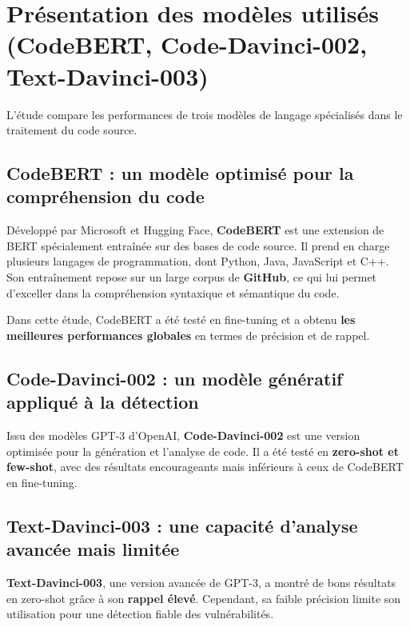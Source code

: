 \chapter{Présentation des modèles utilisés (CodeBERT, Code-Davinci-002, Text-Davinci-003)}



L’étude compare les performances de trois
modèles de langage spécialisés dans le traitement du code source.



\section{CodeBERT : un modèle optimisé pour la compréhension du code}



Développé par Microsoft et Hugging Face, \textbf{CodeBERT}
est une extension de BERT spécialement entraînée sur des bases de code source.
Il prend en charge plusieurs langages de programmation, dont Python, Java,
JavaScript et C++. Son entraînement repose sur un large corpus de \textbf{GitHub},
ce qui lui permet d’exceller dans la compréhension syntaxique et sémantique du
code.



Dans cette étude, CodeBERT a été testé en
fine-tuning et a obtenu \textbf{les meilleures performances globales} en termes
de précision et de rappel.



\section{Code-Davinci-002 : un modèle génératif appliqué à la détection}



Issu des modèles GPT-3 d’OpenAI, \textbf{Code-Davinci-002}
est une version optimisée pour la génération et l’analyse de code. Il a été
testé en \textbf{zero-shot et few-shot}, avec des résultats encourageants mais
inférieurs à ceux de CodeBERT en fine-tuning.



\section{Text-Davinci-003 : une capacité d’analyse avancée mais limitée}



\textbf{Text-Davinci-003}, une version avancée de GPT-3, a montré de bons résultats en
zero-shot grâce à son \textbf{rappel élevé}. Cependant, sa faible précision
limite son utilisation pour une détection fiable des vulnérabilités.
